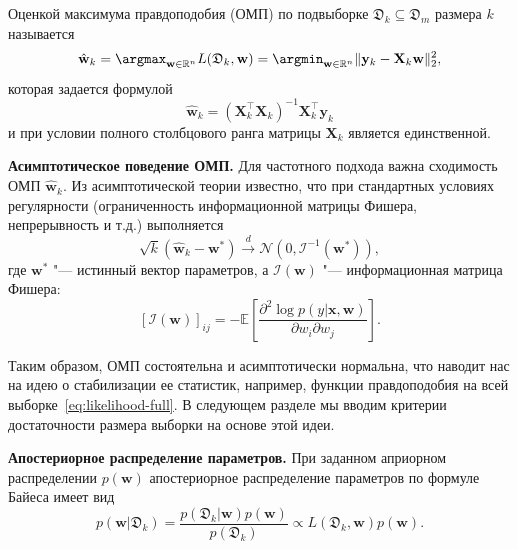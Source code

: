 Оценкой максимума правдоподобия (ОМП) по подвыборке $\mathfrak{D}_k \subseteq \mathfrak{D}_m$ размера $k$ называется
\begin{equation}
    \label{eq:mle}
    \hat{\mathbf{w}}_k = \argmax_{\mathbf{w} \in \mathbb{R}^n} L(\mathfrak{D}_k, \mathbf{w}) = \argmin_{\mathbf{w} \in \mathbb{R}^n} \|\mathbf{y}_k - \mathbf{X}_k \mathbf{w}\|_2^2,
\end{equation}
которая задается формулой
\begin{equation}
    \hat{\mathbf{w}}_k = (\mathbf{X}_k^\top \mathbf{X}_k)^{-1} \mathbf{X}_k^\top \mathbf{y}_k
\end{equation}
и при условии полного столбцового ранга матрицы $\mathbf{X}_k$ является единственной.

\textbf{Асимптотическое поведение ОМП.} Для частотного подхода важна сходимость ОМП $\hat{\mathbf{w}}_k$. Из асимптотической теории известно, что при стандартных условиях регулярности (ограниченность информационной матрицы Фишера, непрерывность и т.\:д.) выполняется
\begin{equation}
    \sqrt{k} (\hat{\mathbf{w}}_k - \mathbf{w}^*) \xrightarrow{d} \mathcal{N}(0, \mathcal{I}^{-1}(\mathbf{w}^*)),
\end{equation}
где $\mathbf{w}^*$ "--- истинный вектор параметров, а $\mathcal{I}(\mathbf{w})$ "--- информационная матрица Фишера:
\begin{equation}
    \label{eq:fisher-information}
    \left[\mathcal{I}(\mathbf{w})\right]_{ij} = - \mathbb{E}\left[ \dfrac{\partial^2 \log p(y | \mathbf{x}, \mathbf{w})}{\partial w_i \partial w_j} \right].
\end{equation}

Таким образом, ОМП состоятельна и асимптотически нормальна, что наводит нас на идею о стабилизации ее статистик, например, функции правдоподобия на всей выборке~\eqref{eq:likelihood-full}. В следующем разделе мы вводим критерии достаточности размера выборки на основе этой идеи.

\textbf{Апостериорное распределение параметров.} При заданном априорном распределении $p(\mathbf{w})$ апостериорное распределение параметров по формуле Байеса имеет вид
\begin{equation}
\label{eq:posterior}
p(\mathbf{w} | \mathfrak{D}_k) = \frac{p(\mathfrak{D}_k | \mathbf{w}) p(\mathbf{w})}{p(\mathfrak{D}_k)} \propto L(\mathfrak{D}_k, \mathbf{w}) p(\mathbf{w}).
\end{equation}

